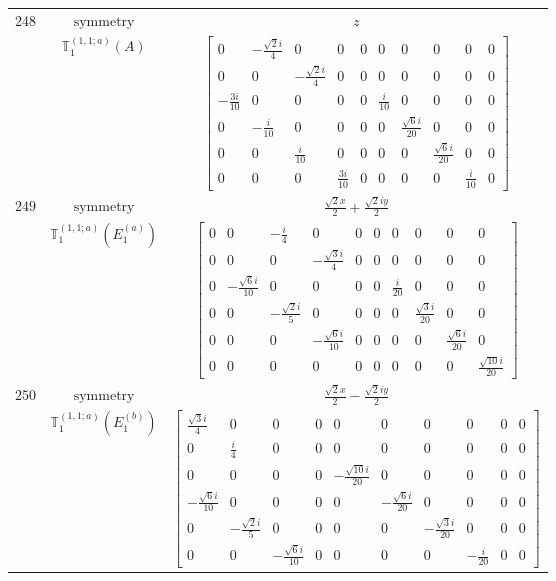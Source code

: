 \documentclass[fleqn,8pt,landscape]{jsarticle}
\begin{document}
\begin{longtable}{ccc}
$ 248 $ & $ \text{symmetry} $ & $ z $ \\
$  $ & $ \mathbb{T}_{1}^{(1,1;a)}(A) $ & $ \begin{bmatrix} 0 & - \frac{\sqrt{2} i}{4} & 0 & 0 & 0 & 0 & 0 & 0 & 0 & 0 \\ 0 & 0 & - \frac{\sqrt{2} i}{4} & 0 & 0 & 0 & 0 & 0 & 0 & 0 \\ - \frac{3 i}{10} & 0 & 0 & 0 & 0 & \frac{i}{10} & 0 & 0 & 0 & 0 \\ 0 & - \frac{i}{10} & 0 & 0 & 0 & 0 & \frac{\sqrt{6} i}{20} & 0 & 0 & 0 \\ 0 & 0 & \frac{i}{10} & 0 & 0 & 0 & 0 & \frac{\sqrt{6} i}{20} & 0 & 0 \\ 0 & 0 & 0 & \frac{3 i}{10} & 0 & 0 & 0 & 0 & \frac{i}{10} & 0 \end{bmatrix} $ \\ \hline
$ 249 $ & $ \text{symmetry} $ & $ \frac{\sqrt{2} x}{2} + \frac{\sqrt{2} i y}{2} $ \\
$  $ & $ \mathbb{T}_{1}^{(1,1;a)}(E_{1}^{(a)}) $ & $ \begin{bmatrix} 0 & 0 & - \frac{i}{4} & 0 & 0 & 0 & 0 & 0 & 0 & 0 \\ 0 & 0 & 0 & - \frac{\sqrt{3} i}{4} & 0 & 0 & 0 & 0 & 0 & 0 \\ 0 & - \frac{\sqrt{6} i}{10} & 0 & 0 & 0 & 0 & \frac{i}{20} & 0 & 0 & 0 \\ 0 & 0 & - \frac{\sqrt{2} i}{5} & 0 & 0 & 0 & 0 & \frac{\sqrt{3} i}{20} & 0 & 0 \\ 0 & 0 & 0 & - \frac{\sqrt{6} i}{10} & 0 & 0 & 0 & 0 & \frac{\sqrt{6} i}{20} & 0 \\ 0 & 0 & 0 & 0 & 0 & 0 & 0 & 0 & 0 & \frac{\sqrt{10} i}{20} \end{bmatrix} $ \\ \hline
$ 250 $ & $ \text{symmetry} $ & $ \frac{\sqrt{2} x}{2} - \frac{\sqrt{2} i y}{2} $ \\
$  $ & $ \mathbb{T}_{1}^{(1,1;a)}(E_{1}^{(b)}) $ & $ \begin{bmatrix} \frac{\sqrt{3} i}{4} & 0 & 0 & 0 & 0 & 0 & 0 & 0 & 0 & 0 \\ 0 & \frac{i}{4} & 0 & 0 & 0 & 0 & 0 & 0 & 0 & 0 \\ 0 & 0 & 0 & 0 & - \frac{\sqrt{10} i}{20} & 0 & 0 & 0 & 0 & 0 \\ - \frac{\sqrt{6} i}{10} & 0 & 0 & 0 & 0 & - \frac{\sqrt{6} i}{20} & 0 & 0 & 0 & 0 \\ 0 & - \frac{\sqrt{2} i}{5} & 0 & 0 & 0 & 0 & - \frac{\sqrt{3} i}{20} & 0 & 0 & 0 \\ 0 & 0 & - \frac{\sqrt{6} i}{10} & 0 & 0 & 0 & 0 & - \frac{i}{20} & 0 & 0 \end{bmatrix} $ \\ \hline

\end{longtable}
\end{document}
